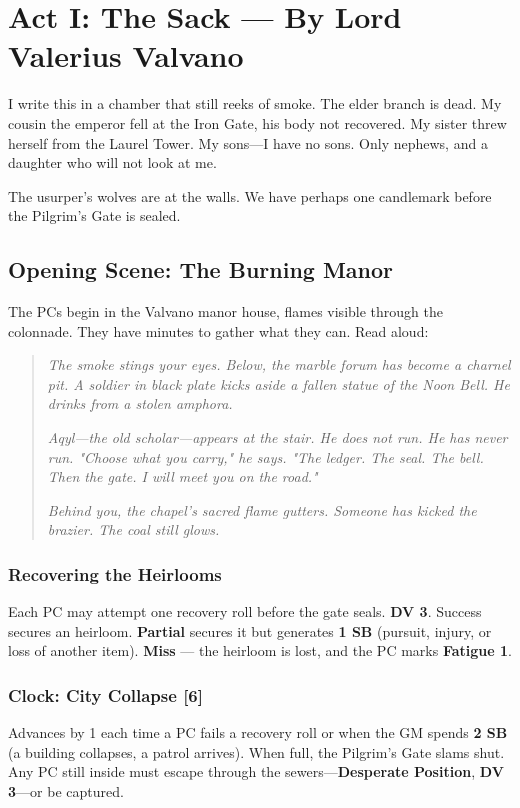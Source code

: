 \documentclass[11pt]{book}
\begin{document}
\clearpage

\chapter{Act I: The Sack --- By Lord Valerius Valvano}

\lettrine{I}{} write this in a chamber that still reeks of smoke. The elder branch is dead. My cousin the emperor fell at the Iron Gate, his body not recovered. My sister threw herself from the Laurel Tower. My sons---I have no sons. Only nephews, and a daughter who will not look at me.

The usurper's wolves are at the walls. We have perhaps one candlemark before the Pilgrim's Gate is sealed.

\section*{Opening Scene: The Burning Manor}
The PCs begin in the Valvano manor house, flames visible through the colonnade. They have minutes to gather what they can. Read aloud:

\begin{quote}
\emph{The smoke stings your eyes. Below, the marble forum has become a charnel pit. A soldier in black plate kicks aside a fallen statue of the Noon Bell. He drinks from a stolen amphora.}

\emph{Aqyl---the old scholar---appears at the stair. He does not run. He has never run. "Choose what you carry," he says. "The ledger. The seal. The bell. Then the gate. I will meet you on the road."}

\emph{Behind you, the chapel's sacred flame gutters. Someone has kicked the brazier. The coal still glows.}
\end{quote}

\subsection*{Recovering the Heirlooms}
Each PC may attempt one recovery roll before the gate seals. \textbf{DV 3}. Success secures an heirloom. \textbf{Partial} secures it but generates \textbf{1 SB} (pursuit, injury, or loss of another item). \textbf{Miss} --- the heirloom is lost, and the PC marks \textbf{Fatigue 1}.

\subsection*{Clock: City Collapse [6]}
Advances by 1 each time a PC fails a recovery roll or when the GM spends \textbf{2 SB} (a building collapses, a patrol arrives). When full, the Pilgrim's Gate slams shut. Any PC still inside must escape through the sewers---\textbf{Desperate Position}, \textbf{DV 3}---or be captured.
\end{document}

